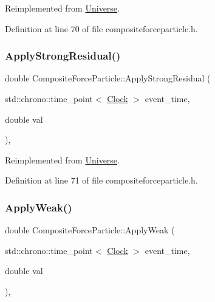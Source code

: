 Reimplemented from \hyperlink{class_universe_a62789bcff84bd750b0366004381e2fdd}{Universe}.



Definition at line 70 of file compositeforceparticle.\+h.

\mbox{\label{class_composite_force_particle_ae0937405e68dd40b19036d5a359f7e07}} 
\subsubsection{\texorpdfstring{Apply\+Strong\+Residual()}{ApplyStrongResidual()}}
{\footnotesize\ttfamily double Composite\+Force\+Particle\+::\+Apply\+Strong\+Residual (\begin{DoxyParamCaption}\item[{std\+::chrono\+::time\+\_\+point$<$ \hyperlink{universe_8h_a0ef8d951d1ca5ab3cfaf7ab4c7a6fd80}{Clock} $>$}]{event\+\_\+time,  }\item[{double}]{val }\end{DoxyParamCaption})\hspace{0.3cm}{\ttfamily [inline]}, {\ttfamily [virtual]}}



Reimplemented from \hyperlink{class_universe_af7becebb347be9a85541d96a3eca1ca7}{Universe}.



Definition at line 71 of file compositeforceparticle.\+h.

\mbox{\label{class_composite_force_particle_a1fd171a0c6fab0cbf9a45a0d24607bde}} 
\subsubsection{\texorpdfstring{Apply\+Weak()}{ApplyWeak()}}
{\footnotesize\ttfamily double Composite\+Force\+Particle\+::\+Apply\+Weak (\begin{DoxyParamCaption}\item[{std\+::chrono\+::time\+\_\+point$<$ \hyperlink{universe_8h_a0ef8d951d1ca5ab3cfaf7ab4c7a6fd80}{Clock} $>$}]{event\+\_\+time,  }\item[{double}]{val }\end{DoxyParamCaption})\hspace{0.3cm}{\ttfamily [inline]}, {\ttfamily [virtual]}}



